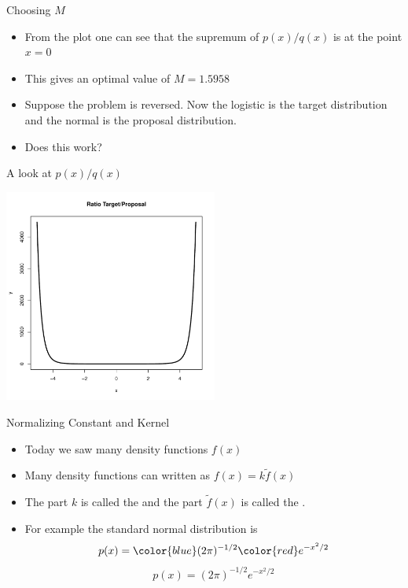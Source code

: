 \documentclass
[handout]
{beamer}
\begin{document}
\begin{frame}{Choosing $M$}
\begin{itemize}
\item From the plot one can see that the supremum of $p(x)/q(x)$ is at the point $x=0$
\pause
\item This gives an optimal value of $M=1.5958$
\pause
\item Suppose the problem is reversed.  Now the logistic is the target distribution and the normal is the proposal distribution.
\pause
\item Does this work?
\end{itemize}
\end{frame}
\begin{frame}{A look at $p(x)/q(x)$}
\begin{center}
\includegraphics[height=7cm]{./Pics/rat2.pdf}
\end{center}
\end{frame}
\begin{frame}{Normalizing Constant and Kernel}
\begin{itemize}
\item Today we saw many density functions $f(x)$
\item Many density functions can written as $f(x)=k\tilde{f}(x)$
\item The part $k$ is called the
and the part $\tilde{f}(x)$ is called the
.
\item For example the standard normal distribution is
{\begin{equation}
p(x)={\color{blue}(2\pi)^{-1/2}}{\color{red}e^{-x^2/2}}
\end{equation}}
{\begin{equation}
p(x)=(2\pi)^{-1/2}e^{-x^2/2}
\end{equation}} 
\pause
\end{itemize}
\end{frame}
\end{document}

